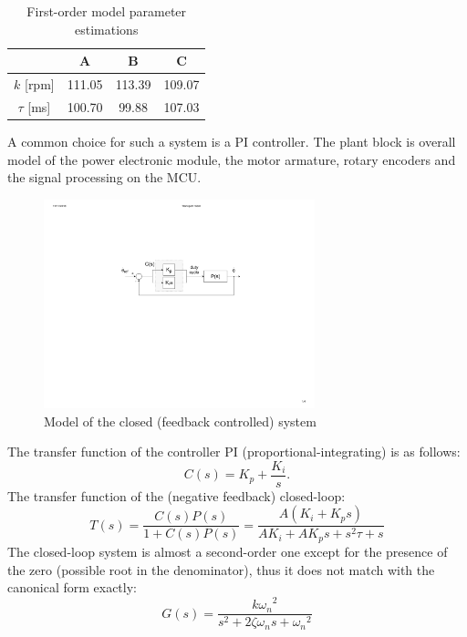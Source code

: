 \documentclass[12pt,english,twoside]{article}
\begin{document}
\begin{table}[h]
	\centering
	\label{first_order_model_table}
	\begin{tabular}{cccc}
		\hline
		& A  		& B  		& C   		\\ \hline
		$k$ {[}rpm{]} 		& 111.05 	& 113.39 	& 109.07 	\\
		$\tau$ {[}ms{]}       & 100.70 	& 99.88 	& 107.03   	\\ \hline
	\end{tabular}
	\caption{First-order model parameter estimations}
\end{table}
A common choice for such a system is a PI controller.\cite{dc_motor_3} The plant block is overall model of the power electronic module, the motor armature, rotary encoders and the signal processing on the MCU. 
\begin{figure}[htb!]
	\centering
	\includegraphics[width=0.7\textwidth]{figures/control_block_diagram}
	\caption{Model of the closed (feedback controlled) system}
	\label{dc_motor_closed_system}
\end{figure}
The transfer function of the controller PI (proportional-integrating) is as follows:
\begin{equation}
C(s) = K_p + \frac{K_i}{s}.
\end{equation}
The transfer function of the (negative feedback) closed-loop:
\begin{equation}
T(s) = \frac{C(s)P(s)}{1+C(s)P(s)}=\frac{A (K_i+K_p s)}{A K_i+A K_p s+s^2 \tau +s}
\label{eq_transfer_function}
\end{equation}
The closed-loop system is almost a second-order one except for the presence of the zero (possible root in the denominator), thus it does not match with the canonical form exactly:
\begin{equation}
G(s) = \frac{{k \omega_n}^2}{s^2 + 2 \zeta \omega_n s +{\omega_n}^2}
\label{eq_transfer_function_canonical}
\end{equation}
\end{document}
